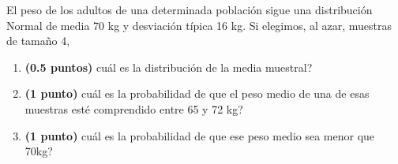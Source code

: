 
El peso de los adultos de una determinada población sigue una distribución Normal de media 70 kg y desviación típica 16 kg. Si elegimos, al azar, muestras de tamaño 4,
\begin{enumerate}[label=\alph*)]
\item \textbf{(0.5 puntos)} \textquestiondown{}cuál es la distribución de la media muestral?
\item \textbf{(1 punto)} \textquestiondown{}cuál es la probabilidad de que el peso medio de una de esas muestras esté comprendido entre 65 y 72 kg?
\item \textbf{(1 punto)} \textquestiondown{}cuál es la probabilidad de que ese peso medio sea menor que 70kg?
\end{enumerate}
